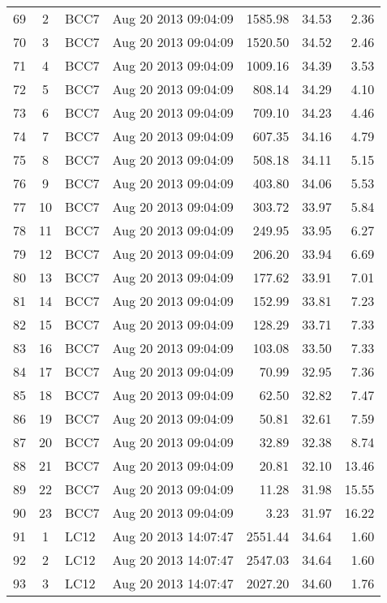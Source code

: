 \documentclass{article}
\begin{document}
\begin{longtable}{ccllrrr}
69 & 2 & BCC7 & Aug 20 2013 09:04:09 & 1585.98 & 34.53 & 2.36 \\
70 & 3 & BCC7 & Aug 20 2013 09:04:09 & 1520.50 & 34.52 & 2.46 \\
71 & 4 & BCC7 & Aug 20 2013 09:04:09 & 1009.16 & 34.39 & 3.53 \\
72 & 5 & BCC7 & Aug 20 2013 09:04:09 & 808.14 & 34.29 & 4.10 \\
73 & 6 & BCC7 & Aug 20 2013 09:04:09 & 709.10 & 34.23 & 4.46 \\
74 & 7 & BCC7 & Aug 20 2013 09:04:09 & 607.35 & 34.16 & 4.79 \\
75 & 8 & BCC7 & Aug 20 2013 09:04:09 & 508.18 & 34.11 & 5.15 \\
76 & 9 & BCC7 & Aug 20 2013 09:04:09 & 403.80 & 34.06 & 5.53 \\
77 & 10 & BCC7 & Aug 20 2013 09:04:09 & 303.72 & 33.97 & 5.84 \\
78 & 11 & BCC7 & Aug 20 2013 09:04:09 & 249.95 & 33.95 & 6.27 \\
79 & 12 & BCC7 & Aug 20 2013 09:04:09 & 206.20 & 33.94 & 6.69 \\
80 & 13 & BCC7 & Aug 20 2013 09:04:09 & 177.62 & 33.91 & 7.01 \\
81 & 14 & BCC7 & Aug 20 2013 09:04:09 & 152.99 & 33.81 & 7.23 \\
82 & 15 & BCC7 & Aug 20 2013 09:04:09 & 128.29 & 33.71 & 7.33 \\
83 & 16 & BCC7 & Aug 20 2013 09:04:09 & 103.08 & 33.50 & 7.33 \\
84 & 17 & BCC7 & Aug 20 2013 09:04:09 & 70.99 & 32.95 & 7.36 \\
85 & 18 & BCC7 & Aug 20 2013 09:04:09 & 62.50 & 32.82 & 7.47 \\
86 & 19 & BCC7 & Aug 20 2013 09:04:09 & 50.81 & 32.61 & 7.59 \\
87 & 20 & BCC7 & Aug 20 2013 09:04:09 & 32.89 & 32.38 & 8.74 \\
88 & 21 & BCC7 & Aug 20 2013 09:04:09 & 20.81 & 32.10 & 13.46 \\
89 & 22 & BCC7 & Aug 20 2013 09:04:09 & 11.28 & 31.98 & 15.55 \\
90 & 23 & BCC7 & Aug 20 2013 09:04:09 & 3.23 & 31.97 & 16.22 \\
\hline
91 & 1 & LC12 & Aug 20 2013 14:07:47 & 2551.44 & 34.64 & 1.60 \\
92 & 2 & LC12 & Aug 20 2013 14:07:47 & 2547.03 & 34.64 & 1.60 \\
93 & 3 & LC12 & Aug 20 2013 14:07:47 & 2027.20 & 34.60 & 1.76 \\

\end{longtable}
\end{document}
